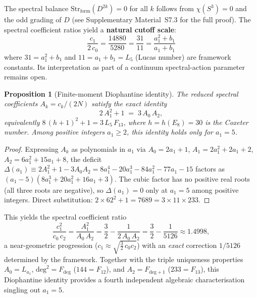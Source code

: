 \documentclass[12pt,a4paper]{article}
\newtheorem{proposition}{Proposition}
\theoremstyle{definition}
\begin{document}
The spectral balance $\mathrm{Str}_{\mathrm{form}}(D^{2k}) = 0$ for all $k$ follows from $\chi(S^3) = 0$ and the odd grading of $D$ (see Supplementary Material~S7.3 for the full proof).  The spectral coefficient ratios yield a \textbf{natural cutoff scale}:
\begin{equation}
\frac{c_1}{2\,c_0} = \frac{14880}{5280} = \frac{31}{11} = \frac{a_1^2 + b_1}{a_1 + b_1}
\label{eq:cutoff_ratio}
\end{equation}
where $31 = a_1^2 + b_1$ and $11 = a_1 + b_1 = L_5$ (Lucas number) are framework constants.  Its interpretation as part of a continuum spectral-action parameter remains open.

\begin{proposition}[Finite-moment Diophantine identity]\label{prop:seeley_diophantine}
The reduced spectral coefficients $A_k = c_k/(2N)$ satisfy the exact identity
\begin{equation}
2\,A_1^2 + 1 \;=\; 3\,A_0\,A_2,
\label{eq:seeley_diophantine}
\end{equation}
equivalently $8\,(h+1)^2 + 1 = 3\,L_5\,F_{13}$, where $h = h(E_8) = 30$ is the Coxeter number.  Among positive integers $a_1 \geq 2$, this identity holds \emph{only} for $a_1 = 5$.
\end{proposition}

\begin{proof}
Expressing $A_k$ as polynomials in $a_1$ via $A_0 = 2a_1+1$, $A_1 = 2a_1^2+2a_1+2$, $A_2 = 6a_1^2+15a_1+8$, the deficit $\Delta(a_1) \equiv 2A_1^2 + 1 - 3A_0 A_2 = 8a_1^4 - 20a_1^3 - 84a_1^2 - 77a_1 - 15$ factors as $(a_1 - 5)(8a_1^3 + 20a_1^2 + 16a_1 + 3)$.  The cubic factor has no positive real roots (all three roots are negative), so $\Delta(a_1) = 0$ only at $a_1 = 5$ among positive integers.  Direct substitution: $2 \times 62^2 + 1 = 7689 = 3 \times 11 \times 233$.
\end{proof}

This yields the spectral coefficient ratio
\begin{equation}
\frac{c_1^2}{c_0\,c_2} = \frac{A_1^2}{A_0\,A_2} = \frac{3}{2} - \frac{1}{2\,A_0\,A_2} = \frac{3}{2} - \frac{1}{5126} \approx 1.4998,
\end{equation}
a near-geometric progression ($c_1 \approx \sqrt{\tfrac{3}{2}\,c_0 c_2}$) with an \emph{exact} correction $1/5126$ determined by the framework.  Together with the triple uniqueness properties $A_0 = L_{a_1}$, $\mathrm{deg}^2 = F_{\mathrm{deg}}$ ($144 = F_{12}$), and $A_2 = F_{\mathrm{deg}+1}$ ($233 = F_{13}$), this Diophantine identity provides a fourth independent algebraic characterisation singling out $a_1 = 5$.
\end{document}
